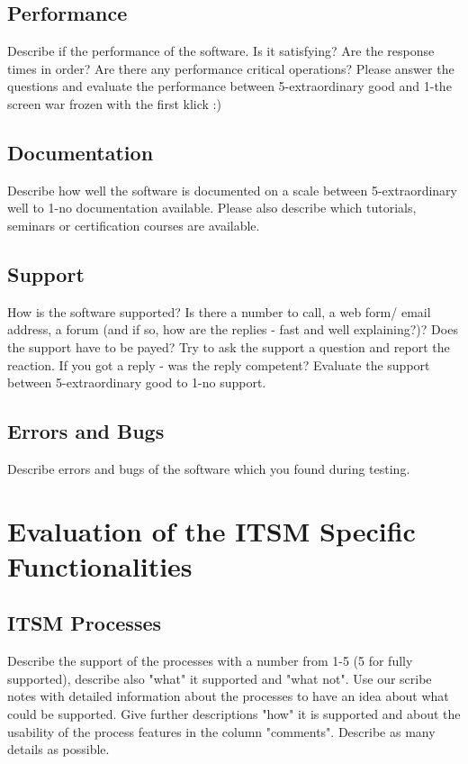 \section{Performance}

Describe if the performance of the software. Is it satisfying? Are the response times in order? Are there any performance critical operations? Please answer the questions and evaluate the performance between 5-extraordinary good and 1-the screen war frozen with the first klick :)

\section{Documentation}

Describe how well the software is documented on a scale between 5-extraordinary well to 1-no documentation available. Please also describe which tutorials, seminars or certification courses are available. 
\section{Support}

How is the software supported? Is there a number to call, a web form/ email address, a forum (and if so, how are the replies - fast and well explaining?)? Does the support have to be payed? Try to ask the support a question and report the reaction. If you got a reply - was the reply competent? Evaluate the support between 5-extraordinary good to 1-no support.

\section{Errors and Bugs}

Describe errors and bugs of the software which you found during testing.

\chapter{Evaluation of the ITSM Specific Functionalities}

\section{ITSM Processes}
\label{sec:itsmprocesses}

Describe the support of the processes with a number from 1-5 (5 for fully supported), describe also "what" it supported and "what not". Use our scribe notes with detailed information about the processes to have an idea about what could be supported. Give further descriptions "how" it is supported and about the usability of the process features in the column "comments". Describe as many details as possible.

